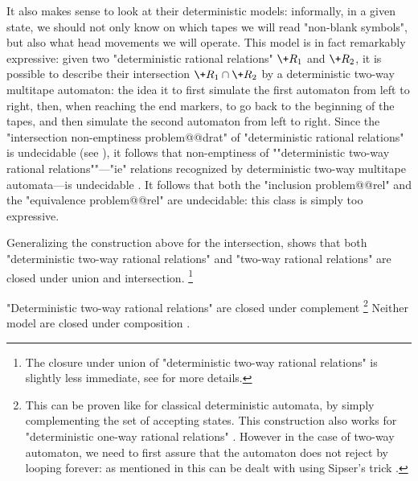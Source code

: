 It also makes sense to look at their deterministic models: informally, in a given state, we
should not only know on which tapes we will read "non-blank symbols",
but also what head movements we will operate.
This model is in fact remarkably expressive: given two "deterministic rational relations"
$\+R_1$ and $\+R_2$, it is possible to describe their intersection $\+R_1 \cap \+R_2$
by a deterministic two-way multitape automaton: the idea it to first simulate the first automaton
from left to right, then, when reaching the end markers, to go back to the beginning of the tapes,
and then simulate the second automaton from left to right.
Since the "intersection non-emptiness problem@@drat"
of "deterministic rational relations" is undecidable (see ),
it follows that non-emptiness of \AP""deterministic two-way rational relations""---"ie"
relations recognized by deterministic two-way multitape automata---is undecidable
\cite[Theorem~19]{RabinScott1959FiniteAutomata}.
It follows that both the "inclusion problem@@rel" and the "equivalence problem@@rel" are
undecidable: this class is simply too expressive.

Generalizing the construction above for the intersection, shows that
both "deterministic two-way rational relations" and "two-way rational relations"
are closed under union and intersection.%
\footnote{The closure under union of "deterministic two-way rational relations"
is slightly less immediate, see \cite[Lemma~4]{CartonExibardSerre2017TwoWayTwoTapeAutomata}
for more details.}

"Deterministic two-way rational relations" are closed under complement%
\footnote{This can be proven like for classical deterministic automata, by simply complementing
the set of accepting states. This construction also works
for "deterministic one-way rational relations" \cite[Theorem~17]{RabinScott1959FiniteAutomata}.
However in the case of two-way automaton,
we need to first assure that the automaton does not reject by looping
forever: as mentioned in \cite[Lemma~4]{CartonExibardSerre2017TwoWayTwoTapeAutomata}
this can be dealt with using Sipser's trick \cite[Theorem~1]{Sipser1980HaltingSpaceBoundedComputations}.}
Neither model are closed under composition \cite[Theorem~5]{CartonExibardSerre2017TwoWayTwoTapeAutomata}.

